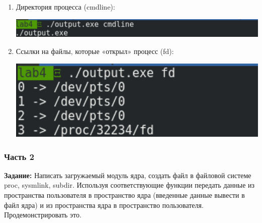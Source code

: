\documentclass[a4paper,14pt]{extreport} %
\begin{document}
\begin{enumerate}
\item Директория процесса (cmdline):

\includegraphics[scale=0.45]{images/cmdline}

\item Ссылки на файлы, которые «открыл» процесс (fd):

\includegraphics[scale=0.45]{images/fd}

\end{enumerate}

\newpage

\subsubsection{Часть 2}

\hfill

\textbf{Задание: } Написать загружаемый модуль ядра, создать файл в файловой системе proc, sysmlink, subdir. Используя соответствующие функции передать данные из пространства пользователя в пространство ядра (введенные данные вывести в файл ядра) и из пространства ядра в пространство пользователя. Продемонстрировать это.
\end{document}
